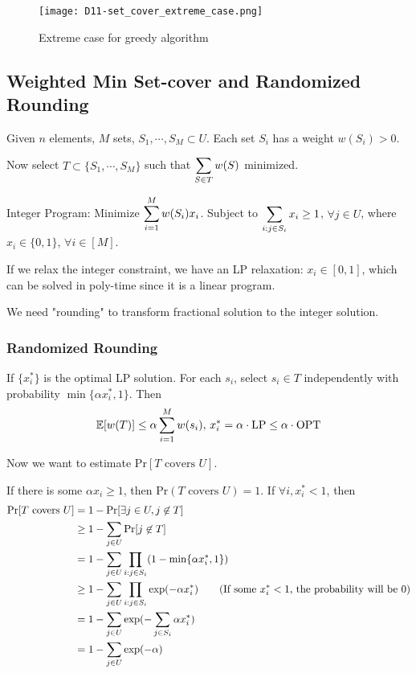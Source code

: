 \begin{figure}[htbp]
    \centering
    \texttt{[image: D11-set\_cover\_extreme\_case.png]}
    \caption{Extreme case for greedy algorithm}
\end{figure}
\subsection{Weighted Min Set-cover and Randomized Rounding}
\begin{example}
    Given  $ n $ elements,  $ M $ sets,  $ S_1,\cdots,S_M\subset U $. Each set  $ S_i $ has a weight  $ w(S_i)>0 $.

    Now select  $ T\subset\{S_1,\cdots, S_M\} $ such that  $ \displaystyle\sum_{S\in T}w(S) $ minimized. 
\end{example}
Integer Program: Minimize  $ \displaystyle\sum_{i=1}^M w(S_i)x_i $. Subject to   $ \displaystyle\sum_{i:j\in S_i} x_i \geq 1$,  $ \forall j\in U $, where  $ x_i\in \{0,1\} $,  $ \forall i\in [M] $.

If we relax the integer constraint, we have an LP relaxation:  $ x_i\in[0,1] $, which can be solved in poly-time since it is a linear program.

We need "rounding" to transform fractional solution to the integer solution.

\subsubsection{Randomized Rounding}
If  $ \{x_i^*\} $ is the optimal LP solution.  For each  $ s_i $, select  $ s_i\in T $ independently with probability   $ \min\{\alpha x_i^*,1\} $. Then 
\[\mathbb E[w(T)] \leq \alpha\sum_{i=1}^M w(s_i),\,x_i^*=\alpha\cdot \mathrm{LP} \leq \alpha\cdot \mathrm{OPT}\] 

Now we want to estimate  $ \mathrm{Pr}[T\text{ covers }U] $.

If there is some  $ \alpha x_i \geq 1 $, then  $ \mathrm{Pr}(T\text{ covers }U)=1 $. If  $ \forall i, x_i^*<1 $,   
then 
\[\begin{aligned}
    \mathrm{Pr}[T\text{ covers }U]&=1-\mathrm{Pr}[ \exists j\in U , j\not\in T ]\\
    & \geq 1-\sum_{j\in U}\mathrm{Pr}[j\not\in T]\\
    &=1-\sum_{j\in U}\prod_{i: j\in S_i}(1-\min\{\alpha x_i^*,1\})\\
    & \geq 1-\sum_{j\in U}\prod_{i: j\in S_i}\exp(-\alpha x_i^*)\qquad\text{(If some $ x_i^*<1 $, the probability will be 0)}\\
    &=1-\sum_{j\in U}\exp(-\sum_{j\in S_i}\alpha x_i^*)\\
    &=1-\sum_{j\in U}\exp(-\alpha)
\end{aligned}\]

